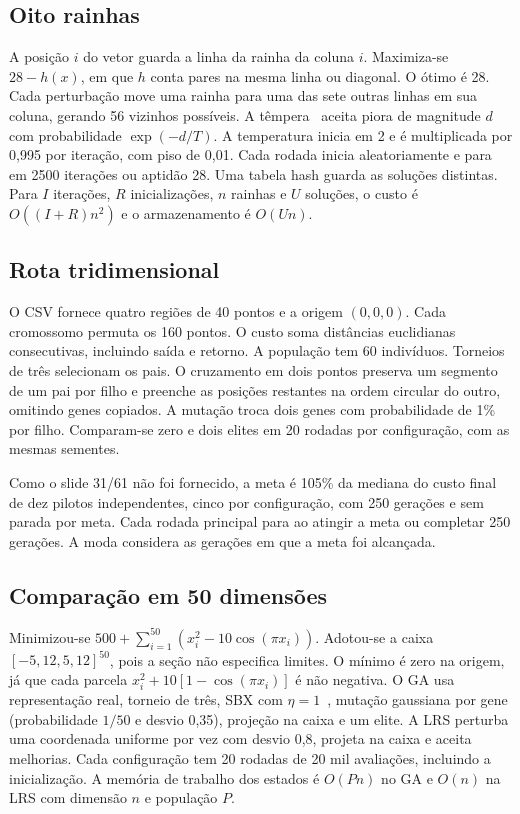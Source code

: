 \documentclass[conference,a4paper]{IEEEtran}
\begin{document}
\subsection{Oito rainhas}
A posição $i$ do vetor guarda a linha da rainha da coluna $i$. Maximiza-se $28-h(x)$, em que $h$ conta pares na mesma linha ou diagonal. O ótimo é 28. Cada perturbação move uma rainha para uma das sete outras linhas em sua coluna, gerando 56 vizinhos possíveis. A têmpera~\cite{kirk} aceita piora de magnitude $d$ com probabilidade $\exp(-d/T)$. A temperatura inicia em 2 e é multiplicada por 0,995 por iteração, com piso de 0,01. Cada rodada inicia aleatoriamente e para em 2500 iterações ou aptidão 28. Uma tabela hash guarda as soluções distintas. Para $I$ iterações, $R$ inicializações, $n$ rainhas e $U$ soluções, o custo é $O((I+R)n^2)$ e o armazenamento é $O(Un)$.
\subsection{Rota tridimensional}
O CSV fornece quatro regiões de 40 pontos e a origem $(0,0,0)$. Cada cromossomo permuta os 160 pontos. O custo soma distâncias euclidianas consecutivas, incluindo saída e retorno. A população tem 60 indivíduos. Torneios de três selecionam os pais. O cruzamento em dois pontos preserva um segmento de um pai por filho e preenche as posições restantes na ordem circular do outro, omitindo genes copiados. A mutação troca dois genes com probabilidade de 1\% por filho. Comparam-se zero e dois elites em 20 rodadas por configuração, com as mesmas sementes.

Como o slide 31/61 não foi fornecido, a meta é 105\% da mediana do custo final de dez pilotos independentes, cinco por configuração, com 250 gerações e sem parada por meta. Cada rodada principal para ao atingir a meta ou completar 250 gerações. A moda considera as gerações em que a meta foi alcançada.
\subsection{Comparação em 50 dimensões}
Minimizou-se $500+\sum_{i=1}^{50}(x_i^2-10\cos(\pi x_i))$. Adotou-se a caixa $[-5{,}12,5{,}12]^{50}$, pois a seção não especifica limites. O mínimo é zero na origem, já que cada parcela $x_i^2+10[1-\cos(\pi x_i)]$ é não negativa. O GA usa representação real, torneio de três, SBX com $\eta=1$~\cite{deb}, mutação gaussiana por gene (probabilidade $1/50$ e desvio 0,35), projeção na caixa e um elite. A LRS perturba uma coordenada uniforme por vez com desvio 0,8, projeta na caixa e aceita melhorias. Cada configuração tem 20 rodadas de 20 mil avaliações, incluindo a inicialização. A memória de trabalho dos estados é $O(Pn)$ no GA e $O(n)$ na LRS com dimensão $n$ e população $P$.
\end{document}
